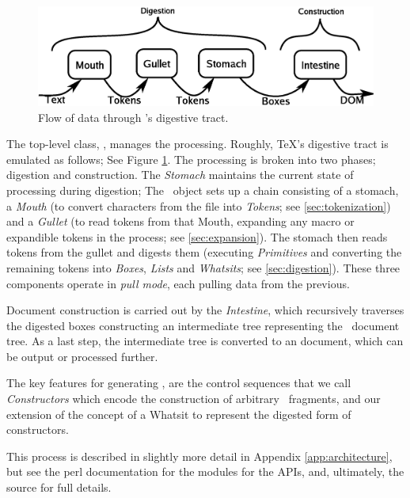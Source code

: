 \documentclass{article}
\newcommand{\LTXLaTeXML}{\pkg{LaTeXML}}
\begin{document}
\begin{figure}[tb]
\includegraphics[width=\columnwidth]{dataflow}
\caption{Flow of data through \LaTeXML's digestive tract.\label{fig:dataflow}}
\end{figure}
The top-level class, \LTXLaTeXML, manages the processing.
Roughly, \TeX's digestive tract is emulated as follows; See Figure \ref{fig:dataflow}.
The processing is broken into two phases; digestion and construction.
The \emph{Stomach}  maintains the current state of processing during digestion;
The \LaTeXML\ object sets up a chain consisting of a stomach, a 
\emph{Mouth} (to convert characters from the file into \emph{Tokens}; see \ref{sec:tokenization}) 
and a \emph{Gullet} (to read tokens from that Mouth, expanding any macro or expandible
tokens in the process; see \ref{sec:expansion}).
The stomach then reads tokens from the gullet and digests them
(executing \emph{Primitives} and  converting the remaining tokens into \emph{Boxes},
\emph{Lists} and \emph{Whatsits}; see \ref{sec:digestion}).
These three components operate in \emph{pull mode}, each pulling data from the previous.

Document construction is carried out by the \emph{Intestine}, which recursively traverses 
the digested boxes constructing an intermediate tree representing the \XML\ document tree.
As a last step, the intermediate tree is converted to an  document,
which can be output or processed further.

The key features for generating \XML, are the control sequences that we
call \emph{Constructors} which encode the construction of arbitrary \XML\ fragments,
and our extension of the concept of a Whatsit to represent the digested form of constructors.

This process is described in slightly more detail in Appendix \ref{app:architecture}, but
see the perl documentation  for the modules for the APIs, and, ultimately,
the source for full details.
\end{document}
